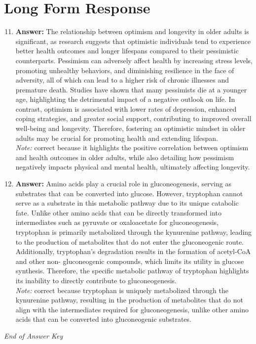 \documentclass[12pt]{article}
\begin{document}
\section*{Long Form Response}
\begin{enumerate}[label=\arabic*.]
\setcounter{enumi}{10}
\item \textbf{Answer:} The relationship between optimism and longevity in older adults is significant, as research suggests that optimistic individuals tend to experience better health outcomes and longer lifespans compared to their pessimistic counterparts. Pessimism can adversely affect health by increasing stress levels, promoting unhealthy behaviors, and diminishing resilience in the face of adversity, all of which can lead to a higher risk of chronic illnesses and premature death. Studies have shown that many pessimists die at a younger age, highlighting the detrimental impact of a negative outlook on life. In contrast, optimism is associated with lower rates of depression, enhanced coping strategies, and greater social support, contributing to improved overall well-being and longevity. Therefore, fostering an optimistic mindset in older adults may be crucial for promoting health and extending lifespan.
\\ \textit{Note:} correct because it highlights the positive correlation between optimism and health outcomes in older adults, while also detailing how pessimism negatively impacts physical and mental health, ultimately affecting longevity.
\item \textbf{Answer:} Amino acids play a crucial role in gluconeogenesis, serving as substrates that can be converted into glucose. However, tryptophan cannot serve as a substrate in this metabolic pathway due to its unique catabolic fate. Unlike other amino acids that can be directly transformed into intermediates such as pyruvate or oxaloacetate for gluconeogenesis, tryptophan is primarily metabolized through the kynurenine pathway, leading to the production of metabolites that do not enter the gluconeogenic route. Additionally, tryptophan's degradation results in the formation of acetyl-CoA and other non- gluconeogenic compounds, which limits its utility in glucose synthesis. Therefore, the specific metabolic pathway of tryptophan highlights its inability to directly contribute to gluconeogenesis.
\\ \textit{Note:} correct because tryptophan is uniquely metabolized through the kynurenine pathway, resulting in the production of metabolites that do not align with the intermediates required for gluconeogenesis, unlike other amino acids that can be converted into gluconeogenic substrates.
\end{enumerate}

\vfill
\noindent\textit{End of Answer Key}
\end{document}
